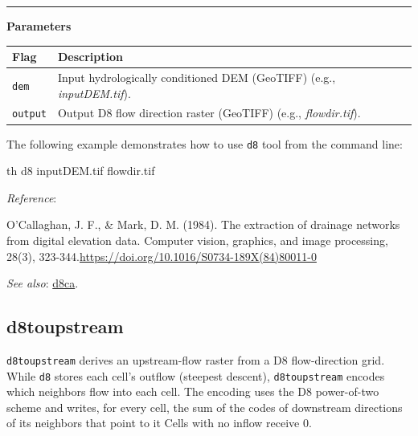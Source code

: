 \documentclass[
]{book}
\newenvironment{Shaded}{\begin{snugshade}}{\end{snugshade}}
\newcommand{\ExtensionTok}[1]{#1}
\newcommand{\NormalTok}[1]{#1}
\begin{document}
\begin{center}\rule{0.5\linewidth}{0.5pt}\end{center}

\textbf{Parameters}

\begin{longtable}[]{@{}
  >{\raggedright\arraybackslash}p{}
  >{\raggedright\arraybackslash}p{}@{}}
\toprule\noalign{}
\begin{minipage}[b]{\linewidth}\raggedright
Flag
\end{minipage} & \begin{minipage}[b]{\linewidth}\raggedright
Description
\end{minipage} \\
\midrule\noalign{}
\endhead
\bottomrule\noalign{}
\endlastfoot
\texttt{dem} & Input hydrologically conditioned DEM (GeoTIFF) (e.g., \emph{inputDEM.tif}). \\
\texttt{output} & Output D8 flow direction raster (GeoTIFF) (e.g., \emph{flowdir.tif}). \\
\end{longtable}

The following example demonstrates how to use \texttt{d8} tool from the command line:

\begin{Shaded}
\begin{Highlighting}[]
\ExtensionTok{th}\NormalTok{ d8 inputDEM.tif flowdir.tif}
\end{Highlighting}
\end{Shaded}

\emph{Reference}:

O'Callaghan, J. F., \& Mark, D. M. (1984). The extraction of drainage networks from digital elevation data. Computer vision, graphics, and image processing, 28(3), 323-344.\url{https://doi.org/10.1016/S0734-189X(84)80011-0}

\emph{See also}: \hyperref[d8ca]{d8ca}.

\subsection{d8toupstream}\label{d8toupstream}

\texttt{d8toupstream} derives an upstream-flow raster from a D8 flow-direction grid. While \texttt{d8} stores each cell's outflow (steepest descent), \texttt{d8toupstream} encodes which neighbors flow into each cell. The encoding uses the D8 power-of-two scheme and writes, for every cell, the sum of the codes of downstream directions of its neighbors that point to it Cells with no inflow receive 0.
\end{document}
